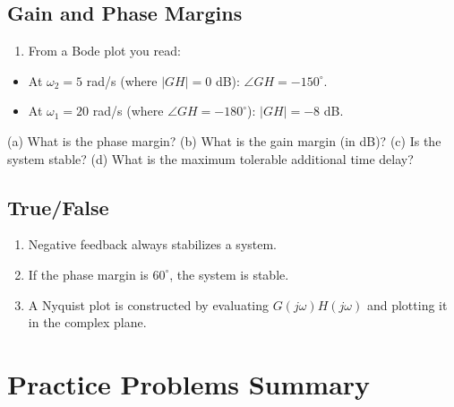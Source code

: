 \documentclass[11pt]{article}
\begin{document}
\subsection*{Gain and Phase Margins}

\begin{enumerate}
  \item From a Bode plot you read:
\end{enumerate}
\begin{itemize}
  \item At $\omega_2 = 5$ rad/s (where $\lvert GH \rvert = 0$ dB): $\angle GH = -150^\circ$.
  \item At $\omega_1 = 20$ rad/s (where $\angle GH = -180^\circ$): $\lvert GH \rvert = -8$ dB.
\end{itemize}

   (a) What is the phase margin?
   (b) What is the gain margin (in dB)?
   (c) Is the system stable?
   (d) What is the maximum tolerable additional time delay?

\subsection*{True/False}

\begin{enumerate}
  \item Negative feedback always stabilizes a system.
  \item If the phase margin is $60^\circ$, the system is stable.
  \item A Nyquist plot is constructed by evaluating $G(j\omega)H(j\omega)$ and plotting it in the complex plane.
\end{enumerate}

\section*{Practice Problems Summary}
\end{document}
